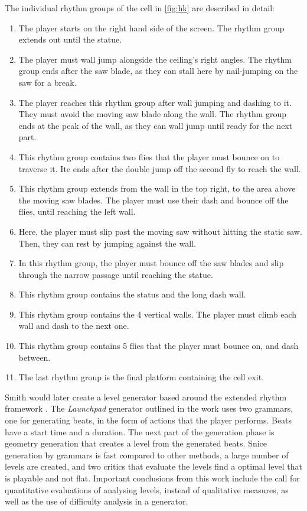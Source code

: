 The individual rhythm groups of the cell in \autoref{fig:hk} are described in detail:
\begin{enumerate}
    \item The player starts on the right hand side of the screen. The rhythm group extends out until the statue.
    \item The player must wall jump alongside the ceiling's right angles. The rhythm group ends after the saw blade, as they can stall here by nail-jumping on the saw for a break.
    \item The player reaches this rhythm group after wall jumping and dashing to it. They must avoid the moving saw blade along the wall. The rhythm group ends at the peak of the wall, as they can wall jump until ready for the next part.
    \item This rhythm group contains two flies that the player must bounce on to traverse it. Ite ends after the double jump off the second fly to reach the wall.
    \item This rhythm group extends from the wall in the top right, to the area above the moving saw blades. The player must use their dash and bounce off the flies, until reaching the left wall.
    \item Here, the player must slip past the moving saw without hitting the static saw. Then, they can rest by jumping against the wall.
    \item In this rhythm group, the player must bounce off the saw blades and slip through the narrow passage until reaching the statue.
    \item This rhythm group contains the status and the long dash wall.
    \item This rhythm group contains the 4 vertical walls. The player must climb each wall and dash to the next one.
    \item This rhythm group contains 5 flies that the player must bounce on, and dash between.
    \item The last rhythm group is the final platform containing the cell exit.
\end{enumerate}

Smith would later create a level generator based around the extended rhythm framework 
\cite{smith2011}. The \emph{Launchpad} generator outlined in the work uses two grammars, one
for generating beats, in the form of actions that the player performs. Beats have a start
time and a duration. The next part of the generation phase is geometry generation that
creates a level from the generated beats. Snice generation by grammars is fast compared to
other methods, a large number of levels are created, and two critics that evaluate the levels
find a optimal level that is playable and not flat. Important conclusions from this work
include the call for quantitative evaluations of analysing levels, instead of qualitative
measures, as well as the use of difficulty analysis in a generator.

